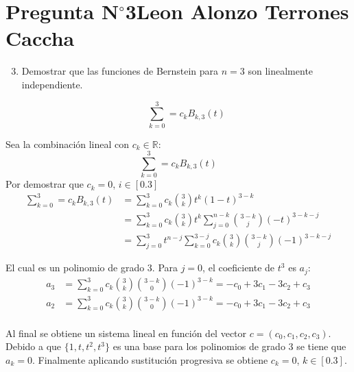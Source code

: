 \section{Pregunta N$^{\circ}$3\qquad Leon Alonzo Terrones Caccha}

\begin{frame}
    \begin{enumerate}\setcounter{enumi}{2}
        \item
              Demostrar que las funciones de Bernstein para $n=3$ son linealmente independiente.

              \[\sum_{k=0}^{3}=c_{k}B_{k,3}(t)\]

    \end{enumerate}

    \begin{solution}
        Sea la combinación lineal con $c_k\in\mathbb{R}:$
        \[\sum_{k=0}^{3}=c_{k}B_{k,3}(t)\]
        Por demostrar que $c_k=0$, $i\in[0.3]$
        \begin{align*}
            \sum_{k=0}^{3}=c_{k}B_{k,3}(t) & =\sum_{k=0}^{3}c_k\binom{3}{k}t^k(1-t)^{3-k}                                        \\
                                           & =\sum_{k=0}^{3}{c_k\binom{3}{k}t^k\sum_{j=0}^{n-k}\binom{3-k}{j}{(-t)^{3-k-j}}}     \\
                                           & =\sum_{j=0}^{3}{t^{n-j}\sum_{k=0}^{3-j}{c_k\binom{3}{k}\binom{3-k}{j}(-1)^{3-k-j}}}
        \end{align*}

        El cual es un polinomio de grado 3.
        Para $j=0$, el coeficiente de $t^3$ es $a_j$:
        \begin{align*}
            a_3&=\sum_{k=0}^{3}{c_k\binom{3}{k}\binom{3-k}{0}(-1)^{3-k}}=-c_0+3c_1-3c_2+c_3\\
            a_2&=\sum_{k=0}^{3}{c_k\binom{3}{k}\binom{3-k}{0}(-1)^{3-k}}=-c_0+3c_1-3c_2+c_3\\
        \end{align*}
    \end{solution}
\end{frame}

\begin{frame}
    \begin{solution}
        Al final se obtiene un sistema lineal en función del vector $c=(c_0,c_1,c_2,c_3)$. Debido a que $\{1,t,t^2,t^3\}$ es una base para los polinomios de grado 3 se tiene que $a_k=0$. Finalmente aplicando sustitución progresiva se obtiene $c_k=0$, $k\in[0.3]$.
    \end{solution}
\end{frame}
